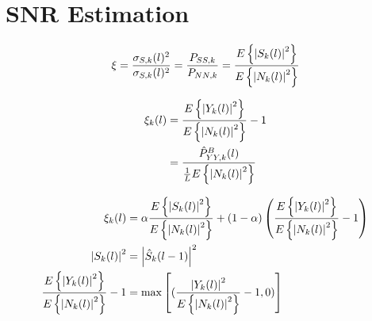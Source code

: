 \section{SNR Estimation} \label{sec:snr_estimation}

\begin{equation}
  \xi = \frac{\sigma_{S,k}(l)^{2}}{\sigma_{S,k}(l)^{2}} =
  \frac{P_{SS,k}}{P_{NN,k}} =
  \frac{E\left\{\abs{S_{k}(l)}^{2}\right\}}{E\left\{\abs{N_{k}(l)}^{2}\right\}}
  \label{eq:SNR}
\end{equation}

\begin{align}
  \xi_{k}(l) &= \frac{E\left\{\abs{Y_{k}(l)}^{2}\right\}}{E\left\{\abs{N_{k}(l)}^{2}\right\}} - 1
  \label{eq:ML1}\\
  &= \frac{\hat P_{YY,k}^{B}(l)}{\frac{1}{L}E\left\{\abs{N_{k}(l)}^{2}\right\}}
  \label{eq:M2}
\end{align}

\begin{align}
  \xi_{k}(l) &= \alpha \frac{E\left\{\abs{S_{k}(l)}^{2}\right\}}{E\left\{\abs{N_{k}(l)}^{2}\right\}} +
  (1-\alpha)\left(\frac{E\left\{\abs{Y_{k}(l)}^{2}\right\}}{E\left\{\abs{N_{k}(l)}^{2}\right\}} - 1\right)
  \label{eq:dd1}\\
  \abs{S_{k}(l)}^{2} &= \abs{\hat S_{k}(l-1)}^{2}
  \label{eq:dd2} \\
  \frac{E\left\{\abs{Y_{k}(l)}^{2}\right\}}{E\left\{\abs{N_{k}(l)}^{2}\right\}} - 1 &=
  \max \left[(\frac{\abs{Y_{k}(l)}^{2}}{E\left\{\abs{N_{k}(l)}^{2}\right\}}-1,0)\right]
\end{align}
